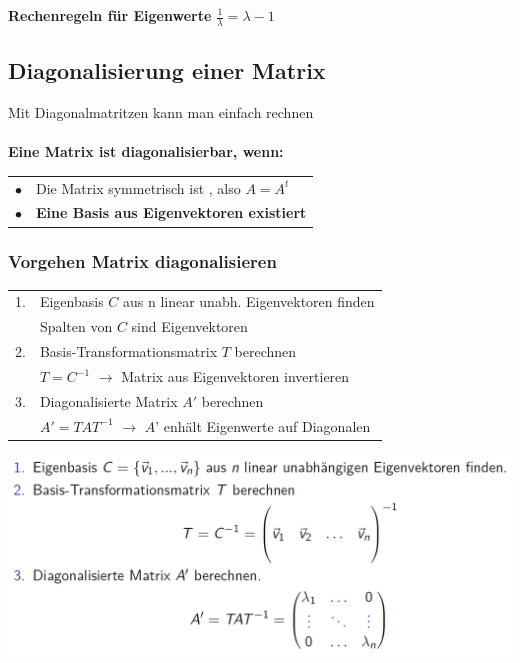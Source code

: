			\textbf{Rechenregeln für Eigenwerte}
			$\frac{1}{\lambda} = \lambda - 1$ \\		 
		 
		 
		 \vfill\null
		 \columnbreak
		 
		 
		 
		 
		 
		 
		   \subsection{Diagonalisierung einer Matrix}
			Mit Diagonalmatritzen kann man einfach rechnen \\	
			\\
			\textbf{Eine Matrix ist diagonalisierbar, wenn:} \\
			\begin{tabular}{ll}
			$\bullet$ & Die Matrix symmetrisch ist , also $A = A^t$\\
			$\bullet$ & \textbf{Eine Basis aus Eigenvektoren existiert} \\
			\end{tabular}				    
			
			\subsubsection{Vorgehen Matrix diagonalisieren} 
		 \begin{tabular}{ll}
		1. & Eigenbasis $C$ aus n linear unabh. Eigenvektoren finden  \\
		& Spalten von $C$ sind Eigenvektoren\\
		2. & Basis-Transformationsmatrix $T$ berechnen \\
		& $T = C^{-1}$ $\rightarrow$ Matrix aus Eigenvektoren invertieren \\
		3. & Diagonalisierte Matrix $A'$ berechnen \\
		& $A' = T A T^{-1}$ $\rightarrow$ $A$' enhält Eigenwerte auf Diagonalen \\
		\end{tabular}		 
		 
		  \includegraphics[width=0.7\linewidth]{Bilder/matrix-diagonalisieren} \\ 
			
